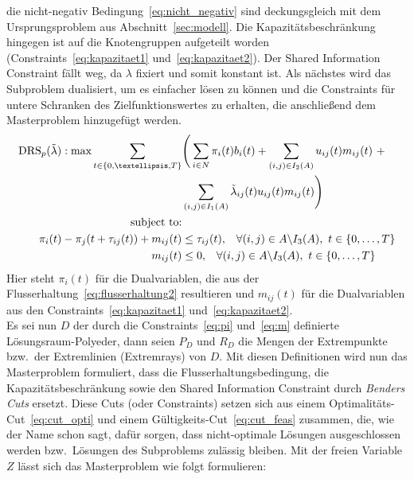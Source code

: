\documentclass[a4paper, 11pt]{scrreprt}
\begin{document}
die nicht-negativ Bedingung~\ref{eq:nicht_negativ} sind
deckungsgleich mit dem Ursprungsproblem aus Abschnitt~\ref{sec:modell}.
Die Kapazitätsbeschränkung hingegen ist auf die Knotengruppen aufgeteilt worden
(Constraints~\ref{eq:kapazitaet1} und~\ref{eq:kapazitaet2}).
Der Shared Information Constraint fällt weg, da $\lambda$ fixiert und somit konstant ist.
Als nächstes wird das Subproblem dualisiert, um es einfacher lösen zu können und die
Constraints für untere Schranken des Zielfunktionswertes zu erhalten, die anschließend dem
Masterproblem hinzugefügt werden.
\begin{align}
  \text{DRS}_p(\tilde{\lambda}):\text{max} \sum_{t \in \{0,…,T\}}&\Bigg(\sum_{i \in N}\pi_i(t)b_i(t) + \sum_{(i,j)\in I_2(A)}u_{ij}(t)m_{ij}(t) \,\,+\notag\\ &\sum_{(i,j)\in I_1(A)} \tilde{\lambda}_{ij}(t) u_{ij}(t) m_{ij}(t)\Bigg)\\
  \text{subject to:}&\notag\\
  \pi_i(t) - \pi_j(t + \tau_{ij}(t)) + m_{ij}(t) &\leq \tau_{ij}(t), \,\,\,\,\, \forall (i, j) \in A \backslash I_3(A), \,\, t \in \{0,\dots,T\}\label{eq:pi}\\
  m_{ij}(t) &\leq 0, \,\,\,\,\, \forall (i, j) \in A \backslash I_3(A), \,\, t \in \{0,\dots,T\}\label{eq:m}
\end{align}
Hier steht $\pi_i(t)$ für die Dualvariablen, die aus der Flusserhaltung~\ref{eq:flusserhaltung2} resultieren
und $m_{ij}(t)$ für die Dualvariablen aus den Constraints~\ref{eq:kapazitaet1} und~\ref{eq:kapazitaet2}.\\
Es sei nun $D$ der durch die Constraints~\ref{eq:pi} und~\ref{eq:m} definierte Lösungsraum-Polyeder, dann
seien $P_D$ und $R_D$ die Mengen der Extrempunkte bzw.\ der Extremlinien (Extremrays) von $D$.
Mit diesen Definitionen wird nun das Masterproblem formuliert, dass die Flusserhaltungsbedingung,
die Kapazitätsbeschränkung sowie den Shared Information Constraint durch \textit{Benders Cuts} ersetzt.
Diese Cuts (oder Constraints) setzen sich aus einem Optimalitäts-Cut~\ref{eq:cut_opti} und einem
Gültigkeits-Cut~\ref{eq:cut_feas} zusammen, die, wie der Name schon sagt, dafür sorgen, dass
nicht-optimale Lösungen ausgeschlossen werden bzw.\ Lösungen des Subproblems zulässig bleiben.
Mit der freien Variable $Z$ lässt sich das Masterproblem wie folgt formulieren:
\end{document}
